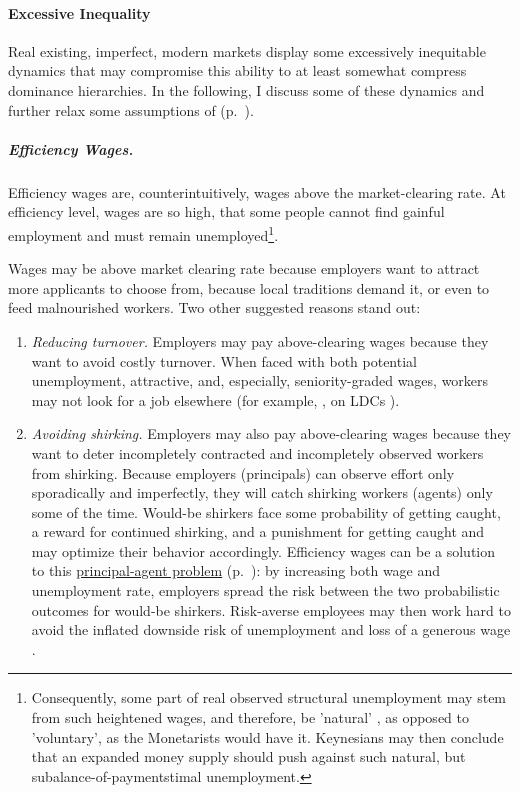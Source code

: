 \paragraph{Excessive Inequality} \label{sec:inequalitydynamics} Real existing, imperfect, modern markets display some excessively inequitable dynamics that may compromise this ability to at least somewhat compress dominance hierarchies. In the following, I discuss some of these dynamics and further relax some assumptions of   (p.~\pageref{sec:perfect-competition}). %

\subparagraph[Efficiency Wages]{Efficiency Wages.}  \label{sec:efficiencywages} Efficiency wages are, counterintuitively, wages above the market-clearing rate. At efficiency level, wages are so high, that some people cannot find gainful employment and must remain unemployed\footnote{
	Consequently, some part of real observed structural unemployment may stem from such heightened wages, and therefore, be 'natural' \citep{Schlicht1978}, as opposed to 'voluntary', as the Monetarists would have it. Keynesians may then conclude that an expanded money supply should push against such natural, but subalance-of-paymentstimal unemployment.}.

Wages may be above market clearing rate because employers want to attract more applicants to choose from, because local traditions demand it, or even to feed malnourished workers. Two other suggested reasons stand out:

\begin{enumerate}
	\item \emph{Reducing turnover.} Employers may pay above-clearing wages because they want to avoid costly turnover. When faced with both potential unemployment, attractive, and, especially, seniority-graded wages, workers may not look for a job elsewhere (for example, \citealt{Salop1979}, on \glspl{LDC} \citealt{Stiglitz1974a}).
	\item \emph{Avoiding shirking.} Employers may also pay above-clearing wages because they want to deter incompletely contracted and incompletely observed workers from shirking. Because employers (principals) can observe effort only sporadically and imperfectly, they will catch shirking workers (agents) only some of the time. Would-be shirkers face some probability of getting caught, a reward for continued shirking, and a punishment for getting caught and may optimize their behavior accordingly. Efficiency wages can be a solution to this \hyperref[sec:principal-agent-problem]{principal-agent problem} (p.~\pageref{sec:principal-agent-problem}): by increasing both wage and unemployment rate, employers spread the risk between the two probabilistic outcomes for would-be shirkers. Risk-averse employees may then work hard to avoid the inflated downside risk of unemployment and loss of a generous wage \citep{Stiglitz1984}.
\end{enumerate}


